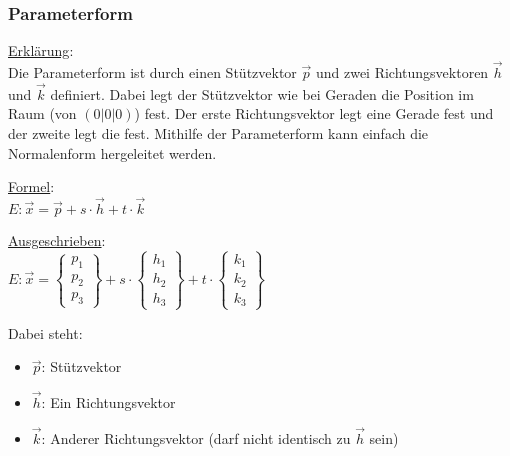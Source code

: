 
\subsubsection{Parameterform}
\underline{Erklärung}: \\
Die Parameterform ist durch einen Stützvektor $\vec{p}$ und zwei Richtungsvektoren $\vec{h}$ und $\vec{k}$ definiert. 
Dabei legt der Stützvektor wie bei Geraden die Position im Raum (von $(0|0|0)$) fest. 
Der erste Richtungsvektor legt eine Gerade fest und der zweite legt die fest.
Mithilfe der Parameterform kann einfach die Normalenform hergeleitet werden.
\par
\underline{Formel}: \\
$
E: \vec{x} = \vec{p} + s\cdot\vec{h} + t\cdot\vec{k}
$
\par
\underline{Ausgeschrieben}: \\
$
E: \vec{x} = 
\begin{Bmatrix}
    p_1 \\ p_2 \\ p_3
\end{Bmatrix}
 + s \cdot
\begin{Bmatrix}
    h_1 \\ h_2 \\ h_3
\end{Bmatrix}
 + t \cdot 
 \begin{Bmatrix}
    k_1 \\ k_2 \\ k_3
 \end{Bmatrix}
$
\par
Dabei steht:
\begin{itemize}
    \item $\vec{p}$: Stützvektor
    \item $\vec{h}$: Ein Richtungsvektor
    \item $\vec{k}$: Anderer Richtungsvektor (darf nicht identisch zu $\vec{h}$ sein)
\end{itemize}
